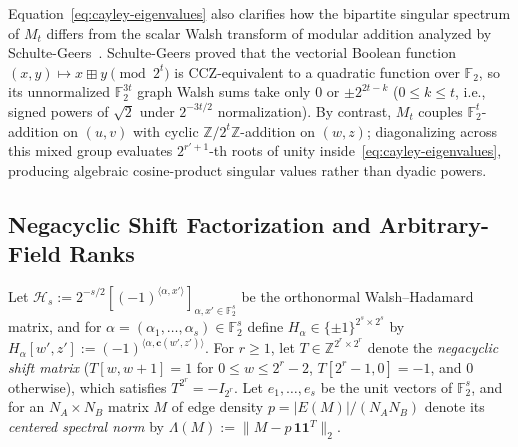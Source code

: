 \documentclass[11pt,reqno]{amsart}
\theoremstyle{definition}
\theoremstyle{remark}
\newcommand{\FF}{\mathbb{F}}
\newcommand{\ZZ}{\mathbb{Z}}
\newcommand{\ind}{\mathbf{1}}
\newcommand{\bv}{\mathbf{c}}
\numberwithin{equation}{section}
\begin{document}
Equation~\eqref{eq:cayley-eigenvalues} also clarifies how the bipartite singular spectrum of $M_t$ differs from the scalar Walsh transform of modular addition analyzed by Schulte-Geers~\cite{SG13}. Schulte-Geers proved that the vectorial Boolean function $(x, y) \mapsto x \boxplus y \pmod{2^t}$ is CCZ-equivalent to a quadratic function over $\FF_2$, so its unnormalized $\FF_2^{3t}$ graph Walsh sums take only $0$ or $\pm 2^{2t-k}$ ($0 \le k \le t$, i.e., signed powers of $\sqrt{2}$ under $2^{-3t/2}$ normalization). By contrast, $M_t$ couples $\FF_2^t$-addition on $(u, v)$ with cyclic $\ZZ/2^t\ZZ$-addition on $(w, z)$; diagonalizing across this mixed group evaluates $2^{r'+1}$-th roots of unity inside~\eqref{eq:cayley-eigenvalues}, producing algebraic cosine-product singular values rather than dyadic powers.

\subsection{Negacyclic Shift Factorization and Arbitrary-Field Ranks}
Let $\mathcal{H}_s := 2^{-s/2}[(-1)^{\langle \alpha, x' \rangle}]_{\alpha, x' \in \FF_2^s}$ be the orthonormal Walsh--Hadamard matrix, and for $\alpha = (\alpha_1, \dots, \alpha_s) \in \FF_2^s$ define $H_\alpha \in \{\pm 1\}^{2^s \times 2^s}$ by $H_\alpha[w', z'] := (-1)^{\langle \alpha, \bv(w', z') \rangle}$. For $r \ge 1$, let $T \in \ZZ^{2^r \times 2^r}$ denote the \emph{negacyclic shift matrix} ($T[w, w+1] = 1$ for $0 \le w \le 2^r - 2$, $T[2^r - 1, 0] = -1$, and $0$ otherwise), which satisfies $T^{2^r} = -I_{2^r}$. Let $e_1, \dots, e_s$ be the unit vectors of $\FF_2^s$, and for an $N_A \times N_B$ matrix $M$ of edge density $p = |E(M)|/(N_A N_B)$ denote its \emph{centered spectral norm} by $\Lambda(M) := \|M - p\,\ind\ind^T\|_2$.
\end{document}
